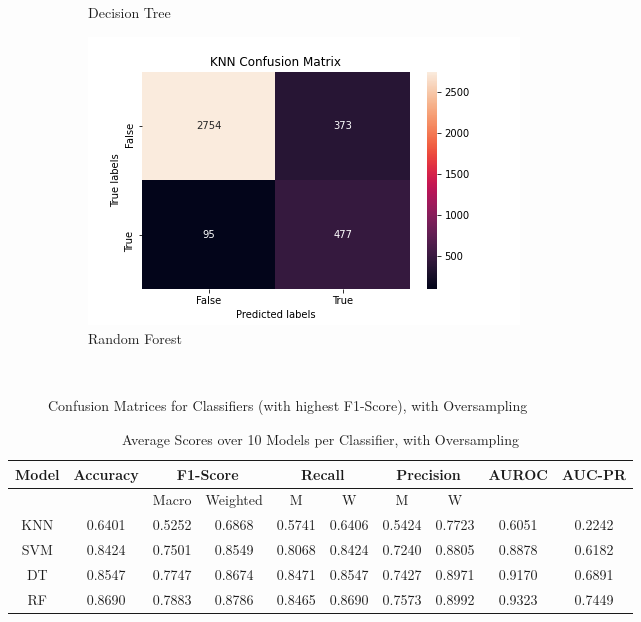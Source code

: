 \documentclass{article}
\begin{document}
\begin{figure}[H]
\begin{subfigure}{.5\linewidth}
\caption{Decision Tree}
\label{fig:dtMatrix_over}
\end{subfigure}%
\begin{subfigure}{.5\linewidth}
\centering
\includegraphics[scale=0.4]{RandomForest_over_confusionMatrix.png}
\caption{Random Forest}
\label{fig:rfMatrix_over}
\end{subfigure}\\[1ex]
\caption{Confusion Matrices for Classifiers (with highest F1-Score), with Oversampling}
\label{fig:confusionMatrix_over}
\end{figure}

\begin{table}[H]
\centering
\begin{tabular}{| c || c | c | c | c | c | c | c | c | c |} 
\hline 
 Model & Accuracy & \multicolumn{2}{|c|}{F1-Score} & \multicolumn{2}{|c|}{Recall} & \multicolumn{2}{|c|}{Precision} & AUROC & AUC-PR \\ \hline
 &  & Macro & Weighted & M & W & M & W & &    \\ \hline 
\hline\hline
KNN &  \cellcolor{red!25}0.6401 & \cellcolor{red!25}0.5252 & \cellcolor{red!25}0.6868 & \cellcolor{red!25}0.5741 & \cellcolor{red!25}0.6406 & \cellcolor{red!25}0.5424 & \cellcolor{red!25}0.7723 & \cellcolor{red!25}0.6051 & \cellcolor{red!25}0.2242  \\ \hline 
SVM & 0.8424 & 0.7501 & 0.8549 & 0.8068 & 0.8424 & 0.7240 & 0.8805 & 0.8878 & 0.6182  \\ \hline 
DT &  0.8547 & 0.7747 & 0.8674 & \cellcolor{green!25}0.8471 & 0.8547 & 0.7427 & 0.8971 & 0.9170 & 0.6891  \\ \hline 
RF & \cellcolor{green!25}0.8690 & \cellcolor{green!25}0.7883 & \cellcolor{green!25}0.8786 & 0.8465 & \cellcolor{green!25}0.8690 & \cellcolor{green!25}0.7573 & \cellcolor{green!25}0.8992 & \cellcolor{green!25}0.9323 & \cellcolor{green!25}0.7449  \\ \hline 
\end{tabular}
\caption{Average Scores over 10 Models per Classifier, with Oversampling}
\label{tab:scores_over}
\end{table}
\end{document}
